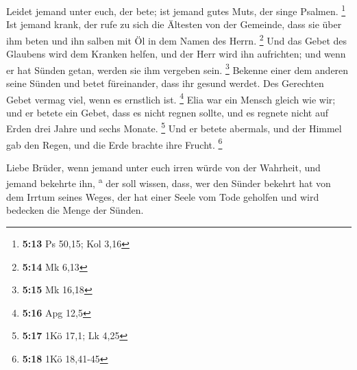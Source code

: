  Leidet jemand unter euch, der bete; ist jemand gutes
Muts, der singe Psalmen. \footnote{\textbf{5:13} Ps 50,15; Kol 3,16}
 Ist jemand krank, der rufe zu sich die Ältesten von der
Gemeinde, dass sie über ihm beten und ihn salben mit Öl in dem Namen des
Herrn. \footnote{\textbf{5:14} Mk 6,13}  Und das Gebet
des Glaubens wird dem Kranken helfen, und der Herr wird ihn aufrichten;
und wenn er hat Sünden getan, werden sie ihm vergeben sein. \footnote{\textbf{5:15}
  Mk 16,18}  Bekenne einer dem anderen seine Sünden und
betet füreinander, dass ihr gesund werdet. Des Gerechten Gebet vermag
viel, wenn es ernstlich ist. \footnote{\textbf{5:16} Apg 12,5}
 Elia war ein Mensch gleich wie wir; und er betete ein
Gebet, dass es nicht regnen sollte, und es regnete nicht auf Erden drei
Jahre und sechs Monate. \footnote{\textbf{5:17} 1Kö 17,1; Lk 4,25}
 Und er betete abermals, und der Himmel gab den Regen,
und die Erde brachte ihre Frucht. \footnote{\textbf{5:18} 1Kö 18,41-45}

 Liebe Brüder, wenn jemand unter euch irren würde von der
Wahrheit, und jemand bekehrte ihn, \textsuperscript{a} 
der soll wissen, dass, wer den Sünder bekehrt hat von dem Irrtum seines
Weges, der hat einer Seele vom Tode geholfen und wird bedecken die Menge
der Sünden.
